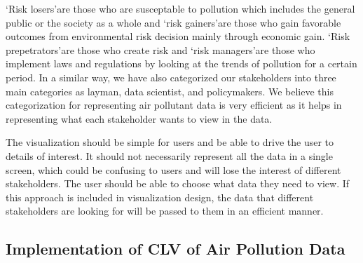
\lq{Risk losers}\rq are those who are susceptable to pollution which includes the general public or the society as a whole and \lq{risk gainers}\rq are those who gain  favorable outcomes from environmental risk  decision mainly through economic gain. \lq{Risk prepetrators}\rq are those who create risk and \lq{risk managers}\rq are those who implement laws and regulations by looking at the trends of pollution for a certain period. 
In a similar way, we have also categorized our stakeholders into three main categories as layman, data scientist, and policymakers. We believe this categorization for representing air pollutant data is very efficient as it helps in representing what each stakeholder wants to view in the data.

The visualization should be simple for users and be able to drive the user to details of interest. It should not necessarily represent all the data in a single screen, which could be confusing to users and will lose the interest of different stakeholders. The user should be able to choose what data they need to view. If this approach is included in visualization design, the data that different stakeholders are looking for will be passed to them in an efficient manner. %

\subsection{Implementation of CLV of Air Pollution Data}


